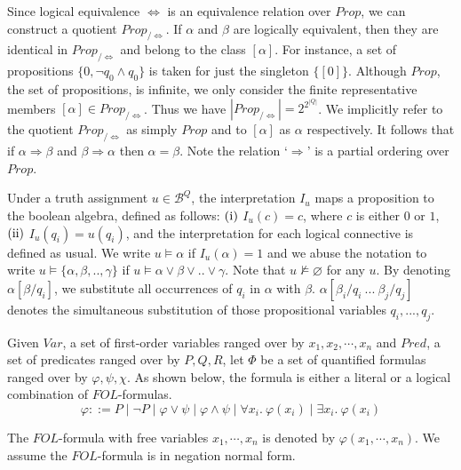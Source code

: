 Since logical equivalence \( \Leftrightarrow \) is an equivalence relation over
\( \mathit{Prop} \), we can construct a quotient \(
\mathit{Prop}_{/\Leftrightarrow} \). If \( \alpha \) and \( \beta \) are
logically equivalent, then they are identical in \(
\mathit{Prop}_{/\Leftrightarrow} \) and belong to the class \( [\alpha] \). For
instance, a set of propositions \( \{ 0, \neg q_0 \wedge q_0 \} \) is taken for
just the singleton \( \{ [0] \} \). Although \( \mathit{Prop} \), the set of
propositions, is infinite, we only consider the finite representative members \(
[\alpha] \in \mathit{Prop}_{/\Leftrightarrow} \). Thus we have \(
|\mathit{Prop}_{/\Leftrightarrow}| = 2^{2^{|Q|}} \). We implicitly refer to the
quotient \( \mathit{Prop}_{/\Leftrightarrow} \) as simply \( \mathit{Prop} \)
and to \( [\alpha] \) as \( \alpha \) respectively.  It follows that if \(
\alpha \Rightarrow \beta \) and \( \beta \Rightarrow \alpha \) then \( \alpha =
\beta \). Note the relation `\( \Rightarrow \)' is a partial ordering over \(
\mathit{Prop} \).

Under a truth assignment \( u \in \mathcal{B}^Q \), the interpretation \( I_u \)
maps a proposition to the boolean algebra, defined as follows: \( (\rm i) \) \(
I_u(c) = c \), where \( c \) is either \( 0 \) or \( 1 \), \( (\rm ii) \) \(
I_u(q_i) = u(q_i) \), and the interpretation for each logical connective is
defined as usual. We write \( u \models \alpha \) if \( I_u(\alpha) = 1 \) and
we abuse the notation to write \( u \models \{\alpha, \beta, .., \gamma \} \) if
\( u \models \alpha \vee \beta \vee ..\vee \gamma \). Note that \( u \not\models
\varnothing \) for any \( u \). By denoting \( \alpha[\beta/q_i] \), we
substitute all occurrences of \( q_i \) in \( \alpha \) with \( \beta \). \(
\alpha[\beta_i/q_i \ ...\ \beta_j/q_j] \) denotes the simultaneous substitution
of those propositional variables \( q_i, ..., q_j \). 

Given \( \mathit{Var} \), a set of first-order variables ranged over by \( x_1,
x_2, \cdots, x_n \) and \( \mathit{Pred} \), a set of predicates ranged over by
\( P, Q, R \), let \( \Phi \) be a set of quantified formulas ranged over by \(
\varphi, \psi, \chi \). As shown below, the formula is either a literal or a
logical combination of \( \mathit{FOL} \)-formulas.
\[
  \varphi ::= P \mid \neg P
  \mid \varphi \vee \psi \mid \varphi \wedge \psi
  \mid \forall x_i .\ \varphi(x_i) \mid \exists x_i .\ \varphi(x_i) 
\]

The \( \mathit{FOL} \)-formula with free variables \( x_1, \cdots, x_n \) is
denoted by \( \varphi(x_1, \cdots, x_n) \). We assume the \( \mathit{FOL}
\)-formula is in negation normal form.
